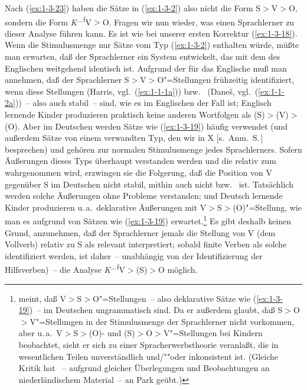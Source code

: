 \documentclass[output=paper]{langsci/langscibook}
\begin{document}
\ssubsubsection{}%
\label{subsubsec:1-3.2.2}

Nach (\ref{ex:1-3-23}) haben die Sätze in (\ref{ex:1-3-2}) also nicht
die Form S$>$V$>$O, sondern die Form
\textit{K}$^{\smallfrown}$\textsuperscript{f}V$>$O. Fragen wir nun wieder, was einen
Sprachlerner zu dieser Analyse führen kann. Es ist wie bei unserer
ersten Korrektur (\ref{ex:1-3-18}). Wenn die Stimulusmenge nur Sätze
vom Typ (\ref{ex:1-3-2}) enthalten würde, müßte man erwarten, daß der
Sprachlerner ein System entwickelt, das mit dem des Englischen
weitgehend identisch ist. Aufgrund der  für das
Englische muß man annehmen, daß der Sprachlerner S$>$V$>$O"=Stellungen
frühzeitig identifiziert, wenn diese Stellungen 
(Harris, vgl.\ (\ref{ex:1-1-1a})) bzw.\ 
(Dane\v{s}, vgl.\ (\ref{ex:1-1-2a}))~-- also auch stabil~-- sind, wie
es im Englischen der Fall ist; Englisch lernende Kinder produzieren
praktisch keine anderen Wortfolgen als (S)$>$(V)$>$(O). Aber im
Deutschen werden Sätze wie (\ref{ex:1-3-19}) häufig verwendet (und
außerdem Sätze von einem verwandten Typ, den wir in X [s.\ Anm.\ S.\,\pageref{fn-herausgeber-topo}] besprechen) und gehören zur normalen Stimulusmenge jedes
Sprachlerners. Sofern Äußerungen dieses Typs überhaupt verstanden
werden und die  relativ zum  wahrgenommen
wird, erzwingen sie die Folgerung, daß die Position von V gegenüber S
im Deutschen nicht stabil, mithin auch nicht 
bzw.\  ist. Tatsächlich werden solche
Äußerungen ohne Probleme verstanden; und Deutsch lernende Kinder
produzieren u.\,a.\ deklarative Äußerungen mit V$>$S$>$(O)"=Stellung,
wie man es aufgrund von Sätzen wie (\ref{ex:1-3-19})
erwartet.\footnote{\label{fn:1-15}%
  \citet{Park1981} meint, daß V$>$S$>$O"=Stellungen~--
  also deklarative Sätze wie (\ref{ex:1-3-19})~-- im Deutschen
  ungrammatisch sind. Da er außerdem glaubt, daß S$>$O$>$V"=Stellungen
  in der Stimulusmenge der Sprachlerner nicht vorkommen, aber
  u.\,a.\ V$>$S$>$(O)- und (S)$>$O$>$V"=Stellungen bei Kindern
  beobachtet, sieht er sich zu einer Spracherwerbstheorie veranlaßt,
  die in wesentlichen Teilen unverständlich und/""oder inkonsistent
  ist. (Gleiche Kritik hat \citet{Klein1974}~-- aufgrund gleicher
  Überlegungen und Beobachtungen an niederländischem Material~-- an
  Park geübt.)%
} 
Es gibt deshalb keinen Grund, anzunehmen, daß der
Sprachlerner jemals die Stellung von V (dem Vollverb) relativ zu S als
relevant interpretiert; sobald finite Verben als solche identifiziert
werden, ist daher~-- unabhängig von der Identifizierung der
Hilfsverben)~-- die Analyse \textit{K}$^{\smallfrown}$\textsuperscript{f}V$>$(S)$>$O
möglich.
\end{document}

